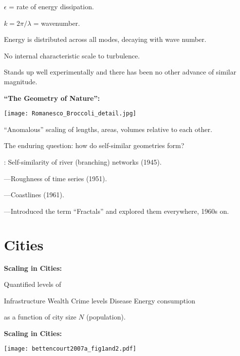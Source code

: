 $\epsilon$ = rate of energy dissipation.

$k = 2\pi/\lambda$ = wavenumber.

Energy is distributed across all modes,
decaying with wave number.

No internal characteristic scale to turbulence.

Stands up well experimentally and there has been no other advance of similar magnitude.

\small
\textbf{ ``The Geometry of Nature'': }

\begin{marginfigure}[]
  \texttt{[image: Romanesco\_Broccoli\_detail.jpg]}\footnotemark[4]
\end{marginfigure}


``Anomalous'' scaling of lengths, areas, volumes relative to each other.

The enduring question: how do self-similar geometries form?

: Self-similarity of river (branching) networks (1945).\cite{horton1945a}

---Roughness of time series (1951).\cite{hurst1951a}

---Coastlines (1961).

---Introduced the term ``Fractals'' and explored
them everywhere, 1960s on.\cite{mandelbrot1967a,mandelbrot1977a,mandelbrot1983a}
\section{Cities}
\textbf{Scaling in Cities:}

Quantified levels of 

Infrastructure
Wealth
Crime levels
Disease
Energy consumption

as a function of city size $N$ (population).

\textbf{Scaling in Cities:}

\begin{marginfigure}[]
  \texttt{[image: bettencourt2007a\_fig1and2.pdf]}
\end{marginfigure}

